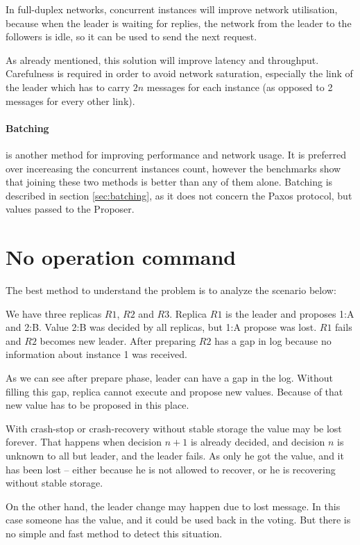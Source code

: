 In full-duplex networks, concurrent instances will improve network utilisation, because when the leader is waiting for replies, the network from the leader to the followers is idle, so it can be used to send the next request. 

As already mentioned, this solution will improve latency and throughput. Carefulness is required in order to avoid network saturation, especially the link of the leader which has to carry $2n$ messages for each instance (as opposed to 2 messages for every other link).

\paragraph{Batching} is another method for improving performance and network usage. It is preferred over incereasing the concurrent instances count, however the benchmarks show that joining these two methods is better than any of them alone. Batching is described in section \ref{sec:batching}, as it does not concern the Paxos protocol, but values passed to the Proposer.

\section{No operation command}

The best method to understand the problem is to analyze the scenario below:

We have three replicas $R1$, $R2$ and $R3$. Replica $R1$ is the leader and proposes {1:A} and {2:B}. Value {2:B} was decided by all replicas, but {1:A} propose was lost. $R1$ fails and $R2$ becomes new leader. After preparing $R2$ has a gap in log because no information about instance 1 was received. 

As we can see after prepare phase, leader can have a gap in the log. Without filling this gap, replica cannot execute and propose new values. Because of that new value has to be proposed in this place.

With crash-stop or crash-recovery without stable storage the value may be lost forever. That happens when decision $n+1$ is already decided, and decision $n$ is unknown to all but leader, and the leader fails. As only he got the value, and it has been lost -- either because he is not allowed to recover, or he is recovering without stable storage.

On the other hand, the leader change may happen due to lost \alive message. In this case someone has the value, and it could be used back in the voting. But there is no simple and fast method to detect this situation.

